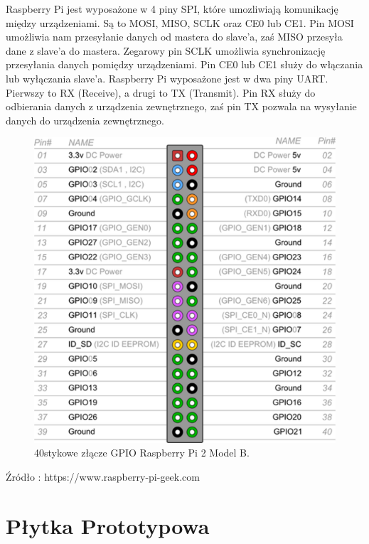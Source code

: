 Raspberry Pi jest wyposażone w 4 piny SPI, które umozliwiają komunikację między urządzeniami. Są to MOSI, MISO, SCLK oraz CE0 lub CE1. Pin MOSI umożliwia nam przesyłanie danych od mastera do slave’a, zaś MISO przesyła dane z slave’a do mastera. Zegarowy pin SCLK umożliwia synchronizację przesyłania danych pomiędzy urządzeniami. Pin CE0 lub CE1 służy do włączania lub wyłączania slave’a. Raspberry Pi wyposażone jest w dwa piny UART. Pierwszy to RX (Receive), a drugi to TX (Transmit). Pin RX służy do odbierania danych z urządzenia zewnętrznego, zaś pin TX pozwala na wysyłanie danych do urządzenia zewnętrznego. 
\begin{figure}[htbp]
	\centering
	\includegraphics[width=0.5\linewidth]{"obrazy/GPIO"}
	\caption{40stykowe złącze GPIO Raspberry Pi 2 Model B.}
	\label{fig:2}
\end{figure}

Źródło : https://www.raspberry-pi-geek.com

\newpage
\section{Płytka Prototypowa}


